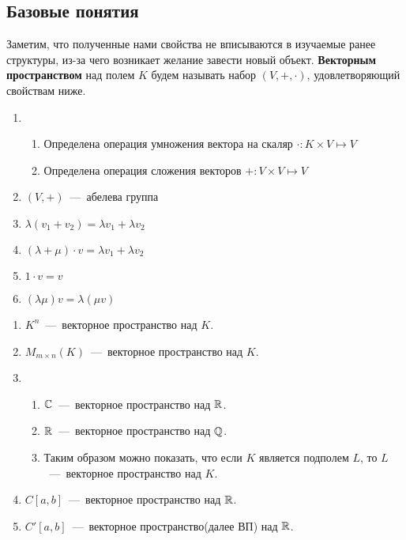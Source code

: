 \subsection{Базовые понятия}
Заметим, что полученные нами свойства не вписываются в изучаемые ранее структуры, из-за чего возникает желание завести новый объект. 
 \textbf{Векторным пространством} над полем $K$ будем называть набор $(V, +, \cdot)$, удовлетворяющий свойствам ниже.
\begin{properties}\leavevmode
    \begin{enumerate}
        \item 
            \begin{enumerate}
                \item Определена операция умножения вектора на скаляр $\cdot: K \times V \mapsto V$
                \item Определена операция сложения векторов $+: V \times V \mapsto V$
            \end{enumerate}
        \item $(V,+)$~---~абелева группа
        \item $\lambda(v_1 + v_2) = \lambda v_1 + \lambda v_2$
        \item $(\lambda + \mu)\cdot v = \lambda v_1 + \lambda v_2$
        \item $1\cdot v = v$
        \item $(\lambda\mu)v = \lambda(\mu v)$
    \end{enumerate}
\end{properties}
\begin{examples}\leavevmode
    \begin{enumerate}
        \item $K^n$~---~векторное пространство над $K$.
        \item $M_{m\times n}(K)$~---~векторное пространство над $K$.
        \item
            \begin{enumerate}
                \item $\mathbb{C}$~---~векторное пространство над $\mathbb{R}$.
                \item $\mathbb{R}$~---~векторное пространство над $\mathbb{Q}$.
                \item Таким образом можно показать, что если $K$ является подполем $L$, то $L$~---~векторное пространство над $K$.
            \end{enumerate}
        \item $C[a,b]$~---~векторное пространство над $\mathbb{R}$.
        \item $C'[a,b]$~---~векторное пространство(далее ВП) над $\mathbb{R}$.
    \end{enumerate}
\end{examples}
